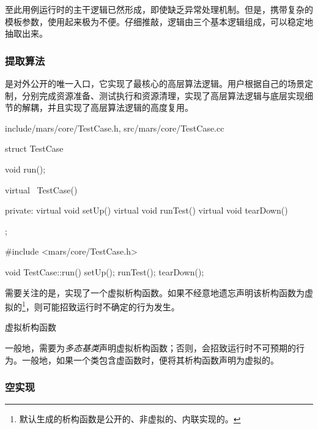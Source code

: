 \begin{content}
至此用例运行时的主干逻辑已然形成，即使缺乏异常处理机制。但是，携带复杂的模板参数，使用起来极为不便。仔细推敲，逻辑由三个基本逻辑组成，可以稳定地抽取出来。

\begin{enum}
\end{enum}

\subsubsection{提取算法}

是对外公开的唯一入口，它实现了最核心的高层算法逻辑。用户根据自己的场景定制，分别完成资源准备、测试执行和资源清理，实现了高层算法逻辑与底层实现细节的解耦，并且实现了高层算法逻辑的高度复用。

\begin{diff}{include/mars/core/TestCase.h, src/mars/core/TestCase.cc}
 \begin{minicpp}
struct TestCase {
  void run();

  virtual ~TestCase() {}

private:
  virtual void setUp() {}
  virtual void runTest() {}
  virtual void tearDown() {}
};
  \end{minicpp}
\tcblower
 \begin{minicpp}
#include <mars/core/TestCase.h>

void TestCase::run() {
  setUp();
  runTest();
  tearDown();
}
  \end{minicpp}
\end{diff}

需要关注的是，实现了一个虚拟析构函数。如果不经意地遗忘声明该析构函数为虚拟的\footnote{默认生成的析构函数是公开的、非虚拟的、内联实现的。}，则可能招致运行时不确定的行为发生。

\begin{episode}{虚拟析构函数}
\begin{content}

一般地，需要为\emph{多态基类}声明虚拟析构函数；否则，会招致运行时不可预期的行为。一般地，如果一个类包含虚函数时，便将其析构函数声明为虚拟的。

\subsubsection{空实现}


\end{content}
\end{episode}
\end{content}

